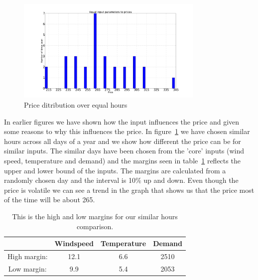 \begin{figure}[H]
\centering
\includegraphics[width=0.8\textwidth ]{billeder/energy_price_plots/same_hour_distribution.png}
\caption{Price ditribution over equal hours}
\label{fig:same_hour_distribution}
\end{figure}

In earlier figures we have shown how the input influences the price and given some reasons to why this influences the price. In figure~\ref{fig:same_hour_distribution} we have chosen similar hours across all days of a year and we show how different the price can be for similar inputs. The similar days have been chosen from the 'core' inputs (wind speed, temperature and demand) and the margins seen in table~\ref{table:similarHoursLimits} reflects the upper and lower bound of the inputs. The margins are calculated from a randomly chosen day and the interval is 10\% up and down. Even though the price is volatile we can see a trend in the graph that shows us that the price most of the time will be about 265.

\begin{table}[H]
\centering  %
\begin{tabular}{|c|c|c|c|} %
	\hline
 & Windspeed & Temperature & Demand \\ [0.5ex] %
\hline                  %
High margin: & 12.1 & 6.6 & 2510  \\ \hline
Low margin: & 9.9 & 5.4 & 2053 \\  \hline
\end{tabular}
\caption{This is the high and low margins for our similar hours comparison.} %
\label{table:similarHoursLimits} %
\end{table}

